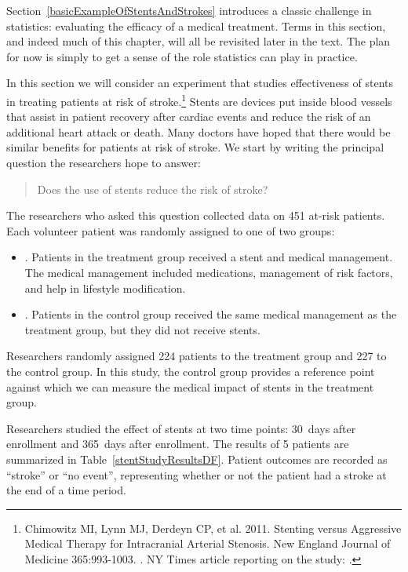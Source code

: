 
Section~\ref{basicExampleOfStentsAndStrokes} introduces a classic challenge in statistics: evaluating the efficacy of a medical treatment. Terms in this section, and indeed much of this chapter, will all be revisited later in the text. The plan for now is simply to get a sense of the role statistics can play in practice.

In this section we will consider an experiment that studies effectiveness of stents in treating patients at risk of stroke.\footnote{Chimowitz MI, Lynn MJ, Derdeyn CP, et al. 2011. Stenting versus Aggressive Medical Therapy for Intracranial Arterial Stenosis. New England Journal of Medicine 365:993-1003. . NY Times article reporting on the study: .} Stents are devices put inside blood vessels that assist in patient recovery after cardiac events and reduce the risk of an additional heart attack or death. Many doctors have hoped that there would be similar benefits for patients at risk of stroke. We start by writing the principal question the researchers hope to answer:
\begin{quote}
Does the use of stents reduce the risk of stroke?
\end{quote}

The researchers who asked this question collected data on 451 at-risk patients. Each volunteer patient was randomly assigned to one of two groups:
\begin{itemize}
\item[]. Patients in the treatment group received a stent and medical management. The medical management included medications, management of risk factors, and help in lifestyle modification.
\item[]. Patients in the control group received the same medical management as the treatment group, but they did not receive stents.
\end{itemize}
Researchers randomly assigned 224 patients to the treatment group and 227 to the control group. In this study, the control group provides a reference point against which we can measure the medical impact of stents in the treatment group.

Researchers studied the effect of stents at two time points: 30~days after enrollment and 365~days after enrollment. The results of 5 patients are summarized in Table~\ref{stentStudyResultsDF}. Patient outcomes are recorded as ``stroke'' or ``no event'', representing whether or not the patient had a stroke at the end of a time period.

